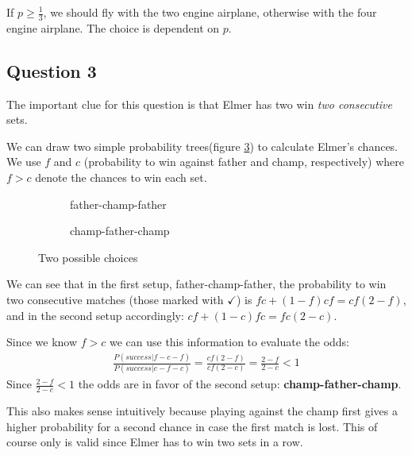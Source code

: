 \documentclass[../main/Notes.tex]{subfiles}
\begin{document}
If $p\geq\frac{1}{3}$, we should fly with the two engine airplane, otherwise with the four engine airplane. The choice is dependent on $p$.



\subsection*{Question 3}
The important clue for this question is that Elmer has two win \textit{two consecutive} sets.

We can draw two simple probability trees(figure \ref{fig:2014-06-06_mt3trees}) to calculate Elmer's chances. We use $f$ and $c$ (probability to win against father and champ, respectively) where $f > c$ denote the chances to win each set.
\begin{figure}[!ht]
  \centering
  \begin{subfigure}{.45\linewidth}
    \centering
    
    \caption{father-champ-father}
    \label{fig:2014-06-06_mt3tree1}
  \end{subfigure}
  \begin{subfigure}{.45\linewidth}
    \centering
    
    \caption{champ-father-champ}
    \label{fig:2014-06-06_mt3tree2}
  \end{subfigure}
  \caption{Two possible choices}
  \label{fig:2014-06-06_mt3trees}
\end{figure}

We can see that in the first setup, father-champ-father, the probability to win two consecutive matches (those marked with $\checkmark$) is $fc+(1-f)cf=cf(2-f)$, and in the second setup accordingly: $cf+(1-c)fc=fc(2-c)$.

Since we know $f>c$ we can use this information to evaluate the odds:
\begin{align*}
\frac{P(success|f-c-f)}{P(success|c-f-c)} = \frac{cf(2-f)}{cf(2-c)} = \frac{2-f}{2-c} < 1
\end{align*}
Since $\frac{2-f}{2-c} < 1$ the odds are in favor of the second setup: \textbf{champ-father-champ}.

This also makes sense intuitively because playing against the champ first gives a higher probability for a second chance in case the first match is lost. This of course only is valid since Elmer has to win two sets in a row.
\end{document}
